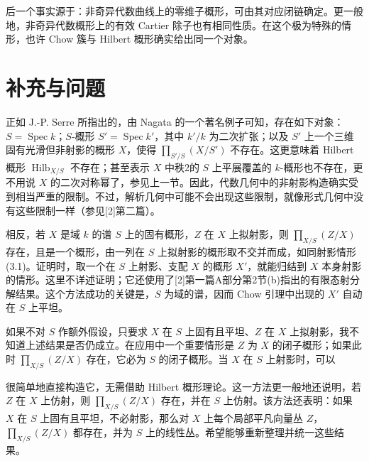 后一个事实源于：非奇异代数曲线上的零维子概形，可由其对应闭链确定。更一般地，非奇异代数概形上的有效 Cartier 除子也有相同性质。在这个极为特殊的情形，也许 Chow 簇与 Hilbert 概形确实给出同一个对象。

\section{补充与问题}
正如 J.-P. Serre 所指出的，由 Nagata 的一个著名例子可知，存在如下对象：$S=\operatorname{Spec}k$；$S$-概形 $S'=\operatorname{Spec}k'$，其中 $k'/k$ 为二次扩张；以及 $S'$ 上一个三维固有光滑但非射影的概形 $X$，使得 $\prod_{S'/S}(X/S')$ 不存在。这更意味着 Hilbert 概形 $\operatorname{Hilb}_{X/S}$ 不存在；甚至表示 $X$ 中秩2的 $S$ 上平展覆盖的 $k$-概形也不存在，更不用说 $X$ 的二次对称幂了，参见上一节。因此，代数几何中的非射影构造确实受到相当严重的限制。不过，解析几何中可能不会出现这些限制，就像形式几何中没有这些限制一样（参见[2]第二篇）。

相反，若 $X$ 是域 $k$ 的谱 $S$ 上的固有概形，$Z$ 在 $X$ 上拟射影，则 $\prod_{X/S}(Z/X)$ 存在，且是一个概形，由一列在 $S$ 上拟射影的概形取不交并而成，如同射影情形(3.1)。证明时，取一个在 $S$ 上射影、支配 $X$ 的概形 $X'$，就能归结到 $X$ 本身射影的情形。这里不详述证明；它还使用了[2]第一篇A部分第2节(b)指出的有限态射分解结果。这个方法成功的关键是，$S$ 为域的谱，因而 Chow 引理中出现的 $X'$ 自动在 $S$ 上平坦。

如果不对 $S$ 作额外假设，只要求 $X$ 在 $S$ 上固有且平坦、$Z$ 在 $X$ 上拟射影，我不知道上述结果是否仍成立。在应用中一个重要情形是 $Z$ 为 $X$ 的闭子概形；如果此时 $\prod_{X/S}(Z/X)$ 存在，它必为 $S$ 的闭子概形。当 $X$ 在 $S$ 上射影时，可以

很简单地直接构造它，无需借助 Hilbert 概形理论。这一方法更一般地还说明，若 $Z$ 在 $X$ 上仿射，则 $\prod_{X/S}(Z/X)$ 存在，并在 $S$ 上仿射。该方法还表明：如果 $X$ 在 $S$ 上固有且平坦，不必射影，那么对 $X$ 上每个局部平凡向量丛 $Z$，$\prod_{X/S}(Z/X)$ 都存在，并为 $S$ 上的线性丛。希望能够重新整理并统一这些结果。

